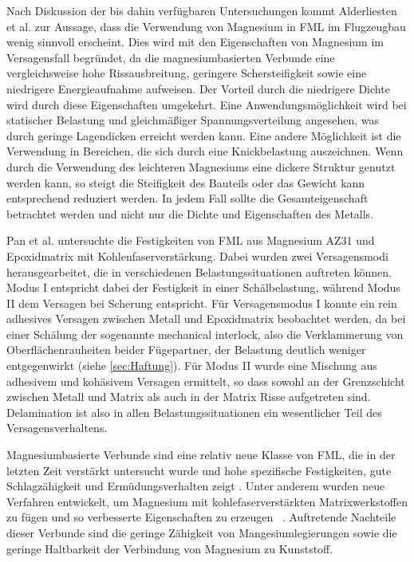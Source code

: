 Nach Diskussion der bis dahin verfügbaren Untersuchungen kommt Alderliesten et al. \cite{Alderliesten.2008} zur Aussage, dass die Verwendung von Magnesium in FML im Flugzeugbau wenig sinnvoll erscheint.
Dies wird mit den Eigenschaften von Magnesium im Versagensfall begründet, da die magnesiumbasierten Verbunde eine vergleichsweise hohe Rissausbreitung, geringere Schersteifigkeit sowie eine niedrigere Energieaufnahme aufweisen.
Der Vorteil durch die niedrigere Dichte wird durch diese Eigenschaften umgekehrt.
Eine Anwendungsmöglichkeit wird bei statischer Belastung und gleichmäßiger Spannungsverteilung angesehen, was durch geringe Lagendicken erreicht werden kann.
Eine andere Möglichkeit ist die Verwendung in Bereichen, die sich durch eine Knickbelastung auszeichnen.
Wenn durch die Verwendung des leichteren Magnesiums eine dickere Struktur genutzt werden kann, so steigt die Steifigkeit des Bauteils oder das Gewicht kann entsprechend reduziert werden.
In jedem Fall sollte die Gesamteigenschaft betrachtet werden und nicht nur die Dichte und Eigenschaften des Metalls. \cite{Alderliesten.2008}

Pan et al. \cite{Pan.2016} untersuchte die Festigkeiten von FML aus Magnesium AZ31 und Epoxidmatrix mit Kohlenfaserverstärkung.
Dabei wurden zwei Versagensmodi herausgearbeitet, die in verschiedenen Belastungssituationen auftreten können.
Modus I entspricht dabei der Festigkeit in einer Schälbelastung, während Modus II dem Versagen bei Scherung entspricht.
Für Versagensmodus I konnte ein rein adhesives Versagen zwischen Metall und Epoxidmatrix beobachtet werden, da bei einer Schälung der sogenannte mechanical interlock, also die Verklammerung von Oberflächenrauheiten beider Fügepartner, der Belastung deutlich weniger entgegenwirkt (siehe \autoref{sec:Haftung}).
Für Modus II wurde eine Mischung aus adhesivem und kohäsivem Versagen ermittelt, so dass sowohl an der Grenzschicht zwischen Metall und Matrix als auch in der Matrix Risse aufgetreten sind.
Delamination ist also in allen Belastungssituationen ein wesentlicher Teil des Versagensverhaltens.

Magnesiumbasierte Verbunde sind eine relativ neue Klasse von FML, die in der letzten Zeit verstärkt untersucht wurde und hohe spezifische Festigkeiten, gute Schlagzähigkeit und Ermüdungsverhalten zeigt \cite{Cicco.2019}.
Unter anderem wurden neue Verfahren entwickelt, um Magnesium mit kohlefaserverstärkten Matrixwerkstoffen zu fügen und so verbesserte Eigenschaften zu erzeugen \cite{Pan.2017}~.
Auftretende Nachteile dieser Verbunde sind die geringe Zähigkeit von Mangesiumlegierungen sowie die geringe Haltbarkeit der Verbindung von Magnesium zu Kunststoff.


